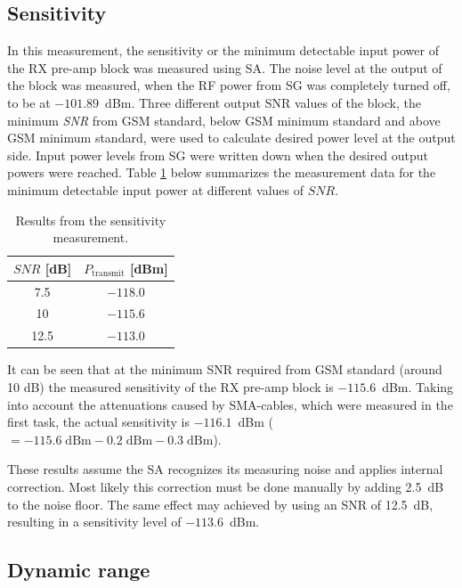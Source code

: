 \documentclass[a4paper, 12pt]{article}
\begin{document}
\subsection{Sensitivity}

In this measurement, the sensitivity or the minimum detectable input power of the RX pre-amp block 
was measured using SA. The noise level at the output of the block was measured, when the RF power from 
SG was completely turned off, to be at $-101.89$~dBm. Three different output SNR values of the block, 
the minimum \textit{SNR} from GSM standard, below GSM minimum standard and above GSM minimum standard, 
were used to calculate desired power level at the output side. Input power levels from SG were written 
down when the desired output powers were reached. Table \ref{t:sens} below summarizes the 
measurement data for the minimum detectable input power at different values of $\textit{SNR}$.

\begin{table}[!h]
	\begin{center}
	\caption{Results from the sensitivity measurement.}
	\label{t:sens}
	\renewcommand*{\arraystretch}{1.2}
	\begin{tabular}{cc}
	$\mathit{SNR}$ [dB] 			& $P_\mathrm{transmit}$ [dBm]  \\
	\hline
	7.5								& $-118.0$ 	\\
	10								& $-115.6$ 	\\
	12.5							& $-113.0$ 	
	\end{tabular}
	\end{center}
	\vspace*{-12pt}
\end{table}

It can be seen that at the minimum SNR required from GSM standard (around 10 dB) the measured 
sensitivity of the RX pre-amp block is $-115.6$~dBm. Taking into account the attenuations caused 
by SMA-cables, which were measured in the first task, the actual sensitivity is $-116.1$~dBm 
(${\!\!}=-115.6\mathrm{\;dBm} - 0.2\mathrm{\;dBm} - 0.3\mathrm{\;dBm}$). 

These results assume the SA recognizes its measuring noise and applies internal correction. Most 
likely this correction must be done manually by adding 2.5~dB to the noise floor. \cite{kakkaa_huuleen} 
The same effect may achieved by using an SNR of 12.5~dB, resulting in a sensitivity level of $-113.6$~dBm.

\subsection{Dynamic range}
\end{document}
